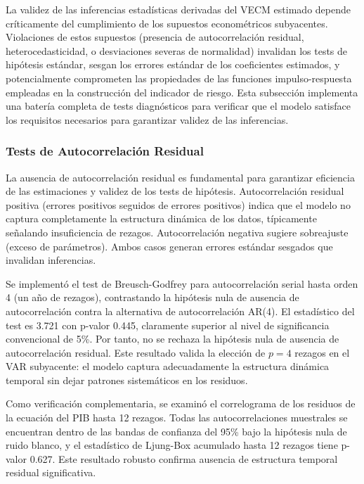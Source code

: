 \documentclass[3p,11pt,draft,natbib=false]{elsarticle}
\begin{document}
La validez de las inferencias estadísticas derivadas del VECM estimado depende críticamente del cumplimiento de los supuestos econométricos subyacentes. Violaciones de estos supuestos (presencia de autocorrelación residual, heterocedasticidad, o desviaciones severas de normalidad) invalidan los tests de hipótesis estándar, sesgan los errores estándar de los coeficientes estimados, y potencialmente comprometen las propiedades de las funciones impulso-respuesta empleadas en la construcción del indicador de riesgo. Esta subsección implementa una batería completa de tests diagnósticos para verificar que el modelo satisface los requisitos necesarios para garantizar validez de las inferencias.

\subsubsection{Tests de Autocorrelación Residual}

La ausencia de autocorrelación residual es fundamental para garantizar eficiencia de las estimaciones y validez de los tests de hipótesis. Autocorrelación residual positiva (errores positivos seguidos de errores positivos) indica que el modelo no captura completamente la estructura dinámica de los datos, típicamente señalando insuficiencia de rezagos. Autocorrelación negativa sugiere sobreajuste (exceso de parámetros). Ambos casos generan errores estándar sesgados que invalidan inferencias.

Se implementó el test de Breusch-Godfrey para autocorrelación serial hasta orden 4 (un año de rezagos), contrastando la hipótesis nula de ausencia de autocorrelación contra la alternativa de autocorrelación AR(4). El estadístico del test es 3.721 con p-valor 0.445, claramente superior al nivel de significancia convencional de 5\%. Por tanto, no se rechaza la hipótesis nula de ausencia de autocorrelación residual. Este resultado valida la elección de $p=4$ rezagos en el VAR subyacente: el modelo captura adecuadamente la estructura dinámica temporal sin dejar patrones sistemáticos en los residuos.

Como verificación complementaria, se examinó el correlograma de los residuos de la ecuación del PIB hasta 12 rezagos. Todas las autocorrelaciones muestrales se encuentran dentro de las bandas de confianza del 95\% bajo la hipótesis nula de ruido blanco, y el estadístico de Ljung-Box acumulado hasta 12 rezagos tiene p-valor 0.627. Este resultado robusto confirma ausencia de estructura temporal residual significativa.
\end{document}
